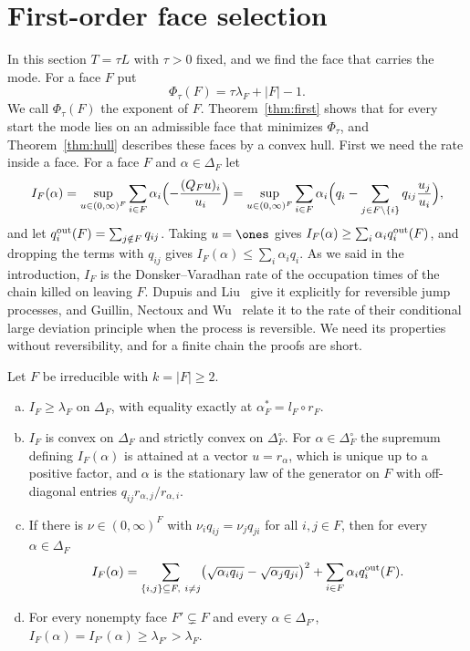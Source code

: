 \section{First-order face selection}\label{sec:firstorder}

In this section $T=\tau L$ with $\tau>0$ fixed, and we find the face that
carries the mode. For a face $F$ put
\[
 \Phi_\tau(F)=\tau\lambda_F+\lvert F\rvert-1 .
\]
We call $\Phi_\tau(F)$ the exponent of $F$. Theorem~\ref{thm:first} shows that
for every start the mode lies on an admissible face that minimizes
$\Phi_\tau$, and Theorem~\ref{thm:hull} describes these faces by a convex
hull. First we need the rate inside a face. For a face $F$ and $\alpha\in\Delta_F$ let
\[
 I_F(\alpha)=\sup_{u\in(0,\infty)^F}\sum_{i\in F}\alpha_i\Bigl(-\frac{(Q_Fu)_i}{u_i}\Bigr)
 =\sup_{u\in(0,\infty)^F}\sum_{i\in F}\alpha_i\Bigl(q_i-\sum_{j\in F\setminus\{i\}}q_{ij}\frac{u_j}{u_i}\Bigr),
\]
and let $q_i^{\rm out}(F)=\sum_{j\notin F}q_{ij}$. Taking $u=\ones$ gives
$I_F(\alpha)\ge\sum_i\alpha_iq_i^{\rm out}(F)$, and dropping the terms with
$q_{ij}$ gives $I_F(\alpha)\le\sum_i\alpha_iq_i$. As we said in the
introduction, $I_F$ is the Donsker--Varadhan rate of the occupation times of
the chain killed on leaving $F$. Dupuis and Liu~\cite{dupuisliu2015} give it
explicitly for reversible jump processes, and Guillin, Nectoux and
Wu~\cite{gnw2024} relate it to the rate of their conditional large deviation
principle when the process is reversible. We need its properties without
reversibility, and for a finite chain the proofs are short.

\begin{proposition}\label{prop:rate}
Let $F$ be irreducible with $k=\lvert F\rvert\ge2$.
\begin{enumerate}[(a)]
\item $I_F\ge\lambda_F$ on $\Delta_F$, with equality exactly at
$\alpha^*_F=l_F\circ r_F$.
\item $I_F$ is convex on $\Delta_F$ and strictly convex on $\Delta_F^\circ$. For
$\alpha\in\Delta_F^\circ$ the supremum defining $I_F(\alpha)$ is attained at a
vector $u=r_\alpha$, which is unique up to a positive factor, and $\alpha$ is
the stationary law of the generator on $F$ with off-diagonal entries
$q_{ij}r_{\alpha,j}/r_{\alpha,i}$.
\item If there is $\nu\in(0,\infty)^F$ with $\nu_iq_{ij}=\nu_jq_{ji}$ for all
$i,j\in F$, then for every $\alpha\in\Delta_F$
\[
 I_F(\alpha)=\sum_{\{i,j\}\subseteq F,\ i\ne j}\bigl(\sqrt{\alpha_iq_{ij}}-\sqrt{\alpha_jq_{ji}}\bigr)^2
 +\sum_{i\in F}\alpha_iq_i^{\rm out}(F).
\]
\item For every nonempty face $F'\subsetneq F$ and every
$\alpha\in\Delta_{F'}$, $I_F(\alpha)=I_{F'}(\alpha)\ge\lambda_{F'}>\lambda_F$.
\end{enumerate}
\end{proposition}

